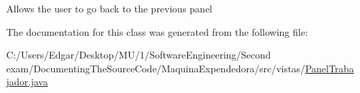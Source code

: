 Allows the user to go back to the previous panel 

The documentation for this class was generated from the following file\+:\begin{DoxyCompactItemize}
\item 
C\+:/\+Users/\+Edgar/\+Desktop/\+M\+U/1/\+Software\+Engineering/\+Second exam/\+Documenting\+The\+Source\+Code/\+Maquina\+Expendedora/src/vistas/\mbox{\hyperlink{_panel_trabajador_8java}{Panel\+Trabajador.\+java}}\end{DoxyCompactItemize}
